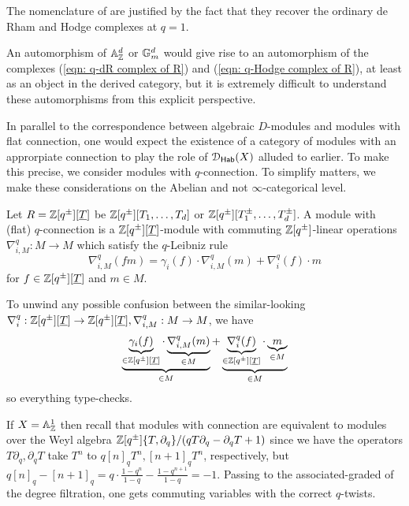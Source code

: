 \begin{remark}
    The nomenclature of  are justified by the fact that they recover the ordinary de Rham and Hodge complexes at $q=1$.
\end{remark} 
\begin{remark}
    An automorphism of $\mathbb{A}^{d}_{\mathbb{Z}}$ or $\mathbb{G}_{m}^{d}$ would give rise to an automorphism of the complexes (\ref{eqn: q-dR complex of R}) and (\ref{eqn: q-Hodge complex of R}), at least as an object in the derived category, but it is extremely difficult to understand these automorphisms from this explicit perspective. 
\end{remark}
In parallel to the correspondence between algebraic $D$-modules and modules with flat connection, one would expect the existence of a category of modules with an approrpiate connection to play the role of $\EuScript{D}_{\mathsf{Hab}}(X)$ alluded to earlier. To make this precise, we consider modules with $q$-connection. To simplify matters, we make these considerations on the Abelian and not $\infty$-categorical level. 
\begin{definition}\label{def: q-connections on modules}
    Let $R=\mathbb{Z}[q^{\pm}][\underline{T}]$ be $\mathbb{Z}[q^{\pm}][T_{1},\dots,T_{d}]$ or $\mathbb{Z}[q^{\pm}][T_{1}^{\pm},\dots,T_{d}^{\pm}]$. A module with (flat) $q$-connection is a $\mathbb{Z}[q^{\pm}][\underline{T}]$-module with commuting $\mathbb{Z}[q^{\pm}]$-linear operations $\nabla_{i,M}^{q}:M\to M$ which satisfy the $q$-Leibniz rule 
    $$\nabla_{i,M}^{q}(fm)=\gamma_{i}(f)\cdot\nabla_{i,M}^{q}(m)+\nabla_{i}^{q}(f)\cdot m$$
    for $f\in \mathbb{Z}[q^{\pm}][\underline{T}]$ and $m\in M$.
\end{definition}
\begin{remark}
    To unwind any possible confusion between the similar-looking $\nabla_{i}^{q}:\mathbb{Z}[q^{\pm}][\underline{T}]\to\mathbb{Z}[q^{\pm}][\underline{T}],\nabla_{i,M}^{q}:M\to M$, we have 
    $$\underbrace{\underbrace{\gamma_{i}(f)}_{\in \mathbb{Z}[q^{\pm}][\underline{T}]}\cdot\underbrace{\nabla_{i,M}^{q}(m)}_{\in M}}_{\in M}+\underbrace{\underbrace{\nabla_{i}^{q}(f)}_{\in \mathbb{Z}[q^{\pm}][\underline{T}]}\cdot\underbrace{m}_{\in M}}_{\in M}$$
    so everything type-checks. 
\end{remark}
\begin{example}\label{ex: A1 with Weyl algebra}
    If $X=\mathbb{A}^{1}_{\mathbb{Z}}$ then recall that modules with connection are equivalent to modules over the Weyl algebra $\mathbb{Z}[q^{\pm}]\{T,\partial_{q}\}/(qT\partial_{q}-\partial_{q}T+1)$ since we have the operators $T\partial_{q},\partial_{q}T$ take $T^{n}$ to $q[n]_{q}T^{n},[n+1]_{q}T^{n}$, respectively, but $q[n]_{q}-[n+1]_{q}=q\cdot\frac{1-q^{n}}{1-q}-\frac{1-q^{n+1}}{1-q}=-1$. Passing to the associated-graded of the degree filtration, one gets commuting variables with the correct $q$-twists. 
\end{example}
